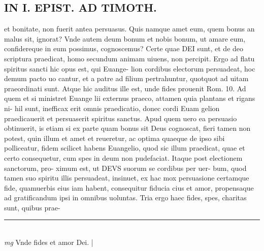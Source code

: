 \documentclass{article}
\begin{document}
\begin{pages}
\section*{IN I. EPIST. AD TIMOTH. }\pstart et bonitate, non fuerit antea persuasus. Quis namque amet eum, quem bonus an malus sit, ignorat? Vnde autem deum bonum et nobis bonum, ut amare eum, confidereque in eum possimus, cognoscemus? Certe quae DEI sunt, et de deo scriptura praedicat, homo secundum animam uiuens, non percipit.   \pend\pstart Ergo ad flatu spiritus sancti hic opus est, qui Euange- lion cordibus electorum persuadeat, hoc demum pacto uo cantur, et a patre ad filium pertrahuntur, quotquot ad uitam praeordinati sunt.  Atque hic auditus ille est, unde fides prouenit Rom. 10.  Ad quem et si ministret Euange lii externus praeco, attamen quia plantans et rigans ni- hil sunt, inefficax erit omnis praedicatio, donec cordi Euam gelion praedicauerit et persuaserit spiritus sanctus.  Apud quem uero ea persuasio obtinuerit, is etiam si ex parte quam bonus sit Deus cognoscat, fieri tamen non potest, quin illum et amet et reueretur, ac optima quaeque de ipso sibi polliceatur, fidem scilicet habens Euangelio, quod sic illum praedicat, quae et certo consequetur, cum spes in deum non pudefaciat.  Itaque post electionem sanctorum, pro- ximum est, ut DEVS suorum se cordibus per uer- bum, quod tamen suo spiritu illis persuadeat, insinuet, ex hac mox persuasione certamque fide, quamuerbis eius iam habent, consequitur fiducia cius et amor, propensaque ad gratificandum ipsi in omnibus uoluntas.   \pend\pstart Tria ergo haec fides, spes, charitas sunt, quibus prae-  \pend
\vspace{0.5cm}\noindent
\vspace{0.2cm}\rule{1cm}{0.2pt}\\ 
\hspace{0.2cm}\textit{mg}
\footnotesize Vnde fides et amor Dei.  
\normalsize| 
\endnumbering
\end{pages}
\end{document}
